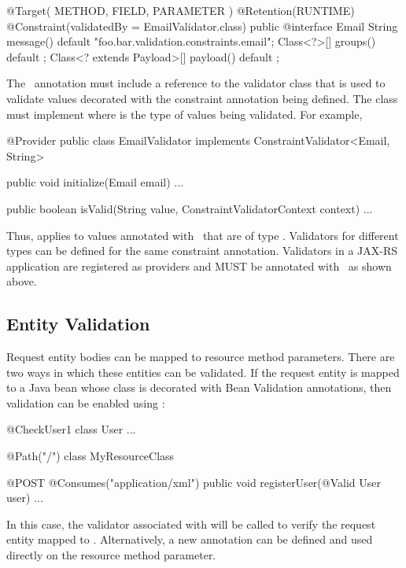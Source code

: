 \begin{listing}{1}
@Target( { METHOD, FIELD, PARAMETER })
@Retention(RUNTIME)
@Constraint(validatedBy = EmailValidator.class)
public @interface Email {
    String message() default "{foo.bar.validation.constraints.email}"; 
    Class<?>[] groups() default {};
    Class<? extends Payload>[] payload() default {};
}
\end{listing}

The \Constraint\ annotation must include a reference to the validator class that is used to validate values decorated with the constraint annotation being defined. The  class must implement  where  is the type of values being validated. For example,

\begin{listing}{1}
@Provider
public class EmailValidator implements ConstraintValidator<Email, String> {
    public void initialize(Email email) { 
        ...
    }

    public boolean isValid(String value, ConstraintValidatorContext context) {
        ...
    }
}
\end{listing}

Thus,  applies to values annotated with \Email\ that are of type . Validators for different types can be defined for the same constraint annotation. Validators in a JAX-RS application are registered as providers and MUST be annotated with \Provider\ as shown above.

\subsection{Entity Validation}

Request entity bodies can be mapped to resource method parameters. There are two ways in which these entities can be validated. If the request entity is mapped to a Java bean whose class is decorated with Bean Validation annotations, then validation can be enabled using \Valid:

\begin{listing}{1}
@CheckUser1
class User { ... }

@Path("/")
class MyResourceClass {

    @POST
    @Consumes("application/xml")
    public void registerUser(@Valid User user) {
        ...
    }
}
\end{listing}

In this case, the validator associated with  will be called to verify the request entity mapped to . Alternatively, a new annotation can be defined and used directly on the resource method parameter. 

